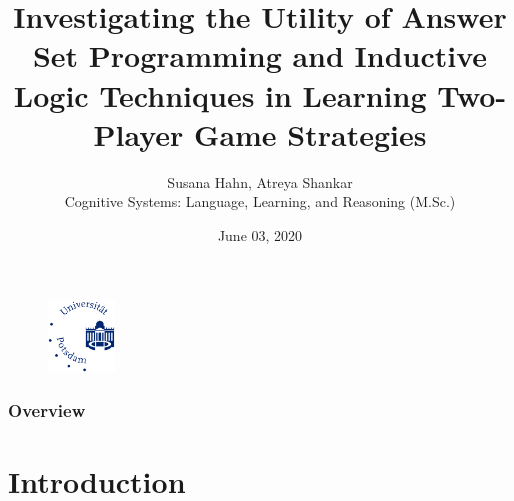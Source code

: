 \documentclass{beamer}
\title{Investigating the Utility of Answer Set Programming and Inductive Logic Techniques in Learning Two-Player Game Strategies}
\author{Susana Hahn, Atreya Shankar \\ Cognitive Systems: Language, Learning, and Reasoning (M.Sc.)}
\institute{PM - Computational Intelligence \\ Knowledge Processing and Information Systems}
\date{June 03, 2020}
\begin{document}
\begin{frame}
\titlepage %
\vspace{-10px}
\begin{figure}
  \includegraphics[width=50pt]{uni-potsdam.jpg}
  \label{fig:logo}
\end{figure}
\end{frame}




\begin{frame}
\frametitle{Overview}
\setcounter{tocdepth}{1}
\tableofcontents 
\end{frame}


\section{Introduction}
\end{document}
